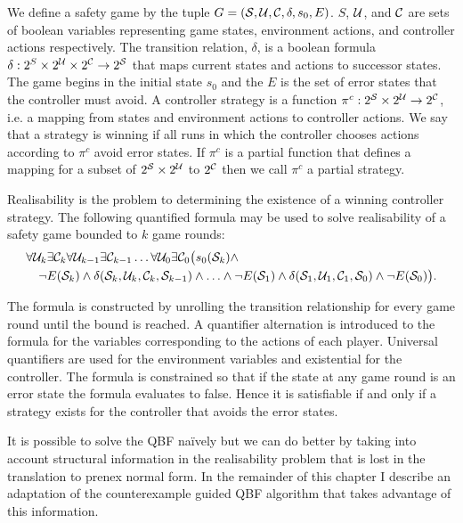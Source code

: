 We define a safety game by the tuple $G = (\mathcal{S}, \mathcal{U}, \mathcal{C}, \delta, s_0, E)$. $S$, $\mathcal{U}$, and $\mathcal{C}$ are sets of boolean variables representing game states, environment actions, and controller actions respectively. The transition relation, $\delta$, is a boolean formula $\delta : 2^{S} \times 2^{\mathcal{U}} \times 2^{\mathcal{C}} \to 2^{\mathcal{S}}$ that maps current states and actions to successor states. The game begins in the initial state $s_0$ and the $E$ is the set of error states that the controller must avoid.  A controller strategy is a function $\pi^c : 2^{\mathcal{S}} \times 2^{\mathcal{U}} \to 2^{\mathcal{C}}$, i.e. a mapping from states and environment actions to controller actions. We say that a strategy is winning if all runs in which the controller chooses actions according to $\pi^c$ avoid error states. If $\pi^c$ is a partial function that defines a mapping for a subset of $2^{\mathcal{S}} \times 2^{\mathcal{U}}$ to $2^{\mathcal{C}}$ then we call $\pi^c$ a partial strategy.

Realisability is the problem to determining the existence of a winning controller strategy.  The following quantified formula may be used to solve realisability of a safety game bounded to $k$ game rounds: 
\begin{equation*}
\begin{multlined}
    \forall \cU_k \exists \cC_k \forall \cU_{k-1} \exists \cC_{k-1} \ldots \forall \cU_0 \exists \cC_0 \big( s_0(\cS_k) \land \\
    \lnot E(\cS_k) \land \delta(\cS_k, \cU_k, \cC_k, \cS_{k-1}) \land \ldots \land \lnot E(\cS_1) \land \delta(\cS_1, \cU_1, \cC_1, \cS_0) \land \lnot E(\cS_0) \big).
\end{multlined}
\end{equation*}

The formula is constructed by unrolling the transition relationship for every game round until the bound is reached. A quantifier alternation is introduced to the formula for the variables corresponding to the actions of each player. Universal quantifiers are used for the environment variables and existential for the controller. The formula is constrained so that if the state at any game round is an error state the formula evaluates to false. Hence it is satisfiable if and only if a strategy exists for the controller that avoids the error states.

It is possible to solve the QBF na\"ively but we can do better by taking into account structural information in the realisability problem that is lost in the translation to prenex normal form. In the remainder of this chapter I describe an adaptation of the counterexample guided QBF algorithm that takes advantage of this information.

